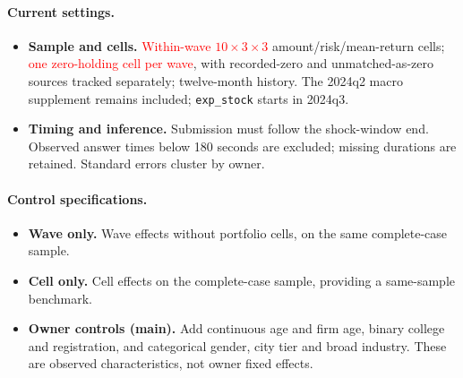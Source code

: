 \documentclass[11pt,letterpaper,english,final]{article}
\begin{document}
\paragraph{Current settings.}
\begin{itemize}
\item \textbf{Sample and cells.} \textcolor{red}{Within-wave $10\times3\times3$} amount/risk/mean-return cells; \textcolor{red}{one zero-holding cell per wave}, with recorded-zero and unmatched-as-zero sources tracked separately; twelve-month history. The 2024q2 macro supplement remains included; \texttt{exp\_stock} starts in 2024q3.
\item \textbf{Timing and inference.} Submission must follow the shock-window end. Observed answer times below 180 seconds are excluded; missing durations are retained. Standard errors cluster by owner.
\end{itemize}

\paragraph{Control specifications.}
\begin{itemize}
\item \textbf{Wave only.} Wave effects without portfolio cells, on the same complete-case sample.
\item \textbf{Cell only.} Cell effects on the complete-case sample, providing a same-sample benchmark.
\item \textbf{Owner controls (main).} Add continuous age and firm age, binary college and registration, and categorical gender, city tier and broad industry. These are observed characteristics, not owner fixed effects.
\end{itemize}
\end{document}

